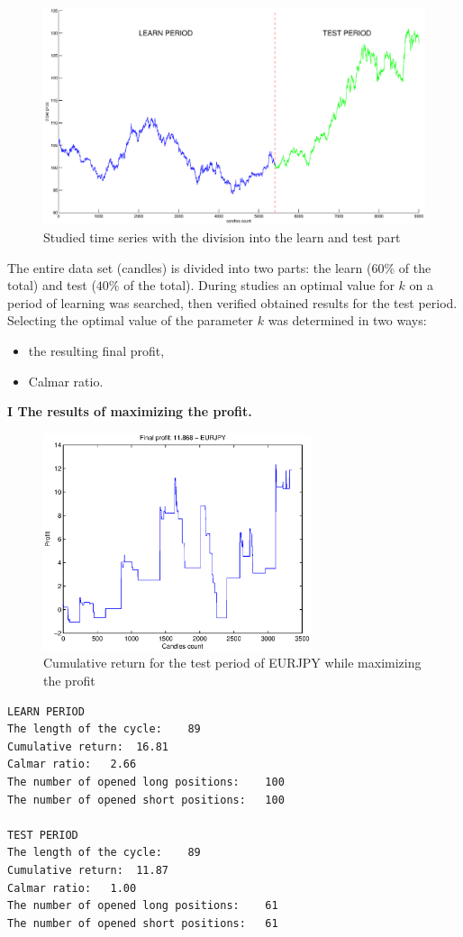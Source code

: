 \begin{figure}[h!]
\centering
\includegraphics[width = \textwidth]{podzialDanych.eps}
\caption{Studied time series with the division into the learn and test part}
\label{rysunek2roc}
\end{figure}
\FloatBarrier
The entire data set (candles) is divided into two parts: the learn ($60 \%$ of the total) and test ($40\%$ of the total). During studies an optimal value for $k$ on a period of learning was searched, then verified obtained results for the test period. Selecting the optimal value of the parameter $ k $ was determined in two ways:
\begin{itemize}
\item the resulting final profit,
\item Calmar ratio.
\end{itemize}
\newpage
\noindent \textbf{I The results of maximizing the profit.}\\
\begin{figure}[h!]
\centering
\includegraphics[width = 0.7\textwidth]{ROC_EURJPY_LS_SearchBestK_zysk.eps}
\caption{Cumulative return for the test period of EURJPY  while maximizing the profit}
\end{figure}
\FloatBarrier
\begin{verbatim}
LEARN PERIOD
The length of the cycle: 	89
Cumulative return: 	16.81
Calmar ratio: 	2.66
The number of opened long positions: 	100
The number of opened short positions:  	100

TEST PERIOD
The length of the cycle: 	89
Cumulative return: 	11.87
Calmar ratio: 	1.00
The number of opened long positions: 	61
The number of opened short positions: 	61
\end{verbatim}

